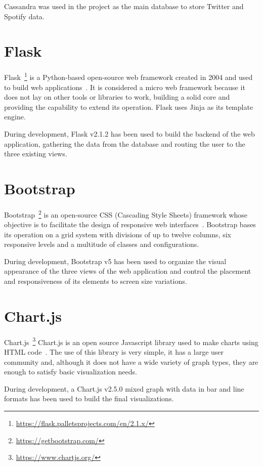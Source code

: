 \nonzeroparskip Cassandra was used in the project as the main database to store Twitter and Spotify data.

\section{Flask}

\nonzeroparskip Flask~\footnote{\url{https://flask.palletsprojects.com/en/2.1.x/}} is a Python-based open-source web framework created in 2004 and used to build web applications~\cite{flask}. It is considered a micro web framework because it does not lay on other tools or libraries to work, building a solid core and providing the capability to extend its operation. Flask uses Jinja as its template engine.

\nonzeroparskip During development, Flask v2.1.2 has been used to build the backend of the web application, gathering the data from the database and routing the user to the three existing views.

\section{Bootstrap}

\nonzeroparskip Bootstrap~\footnote{\url{https://getbootstrap.com/}} is an open-source CSS (Cascading Style Sheets) framework whose objective is to facilitate the design of responsive web interfaces~\cite{bootstrap}. Bootstrap bases its operation on a grid system with divisions of up to twelve columns, six responsive levels and a multitude of classes and configurations.

\nonzeroparskip During development, Bootstrap v5 has been used to organize the visual appearance of the three views of the web application and control the placement and responsiveness of its elements to screen size variations.

\section{Chart.js}

\nonzeroparskip Chart.js~\footnote{\url{https://www.chartjs.org/}} Chart.js is an open source Javascript library used to make charts using HTML code~\cite{w3schools_chartjs}. The use of this library is very simple, it has a large user community and, although it does not have a wide variety of graph types, they are enough to satisfy basic visualization needs.

\nonzeroparskip During development, a Chart.js v2.5.0 mixed graph with data in bar and line formats has been used to build the final visualizations.

